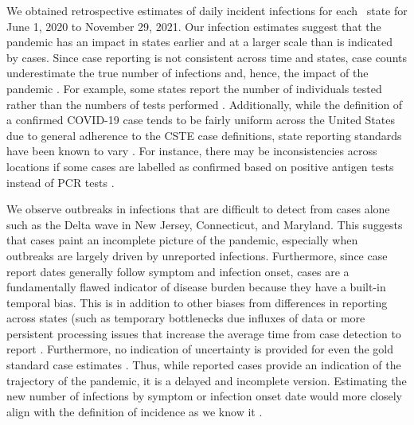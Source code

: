\documentclass{article}
\begin{document}
We obtained retrospective estimates of daily incident infections for each \US\
state for June 1, 2020 to November 29, 2021. 
Our infection estimates suggest that the pandemic has an impact
in states earlier and at a larger scale than is indicated by cases. Since
case reporting is not consistent across time and states, case counts
underestimate the true number of infections and, hence, the impact of the
pandemic \citep{cdc2022estimated, simon2022inconsistent}. For example, some
states report the number of individuals tested rather than the numbers of tests
performed \citep{schechtman2020counting, chitwood2022reconstructing}.
Additionally, while the definition of a confirmed COVID-19 case tends to be fairly
uniform across the United States due to general adherence to the 
CSTE case definitions, state reporting standards have been known to vary 
\citep{cste2020, delphiepidata2020}. 
For instance, there may be inconsistencies across locations if some cases
are labelled as confirmed based on positive antigen tests instead of PCR
tests \citep{covidtracking2021}. 

We observe outbreaks in infections that are difficult to detect from cases
alone such as the Delta wave in New Jersey, Connecticut, and Maryland. 
This suggests that cases paint an incomplete 
picture of the pandemic, especially when outbreaks are largely driven by 
unreported infections. Furthermore, since case report dates generally follow symptom and infection
onset, cases are a fundamentally flawed indicator of disease burden because they
have a built-in temporal bias. This is in addition to other biases from
differences in reporting across states (such as temporary bottlenecks due
influxes of data or more persistent processing issues that increase the average
time from case detection to report \citep{wash2020dash, dunkel2020covid19}. 
Furthermore, no indication of uncertainty is provided for even the gold standard case estimates
\citep{delphiepidata2020}. 
Thus, while reported cases provide an indication of the trajectory of the pandemic, it
is a delayed and incomplete version. Estimating the new number of infections by
symptom or infection onset date would more closely align with the definition of
incidence as we know it \citep{jahja2022real}.
\end{document}

